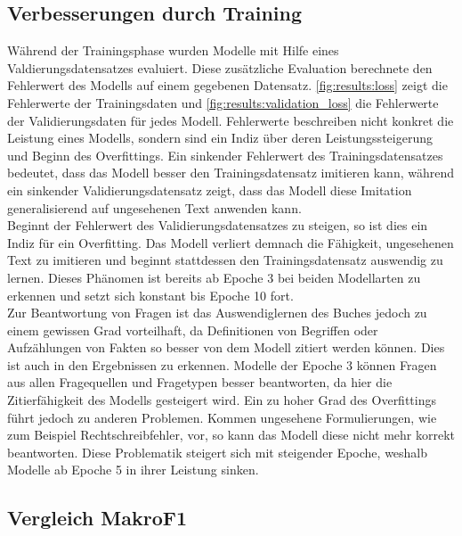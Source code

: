 \subsection{Verbesserungen durch Training}
Während der Trainingsphase wurden Modelle mit Hilfe eines Valdierungsdatensatzes evaluiert.
Diese zusätzliche Evaluation berechnete den Fehlerwert des Modells auf einem gegebenen Datensatz.
\cref{fig:results:loss} zeigt die Fehlerwerte der Trainingsdaten und \cref{fig:results:validation_loss} die Fehlerwerte der Validierungsdaten für jedes Modell.
Fehlerwerte beschreiben nicht konkret die Leistung eines Modells, sondern sind ein Indiz über deren Leistungssteigerung und Beginn des Overfittings.
Ein sinkender Fehlerwert des Trainingsdatensatzes bedeutet, dass das Modell besser den Trainingsdatensatz imitieren kann, während ein sinkender Validierungsdatensatz zeigt, dass das Modell diese Imitation generalisierend auf ungesehenen Text anwenden kann.\\

Beginnt der Fehlerwert des Validierungsdatensatzes zu steigen, so ist dies ein Indiz für ein Overfitting.
Das Modell verliert demnach die Fähigkeit, ungesehenen Text zu imitieren und beginnt stattdessen den Trainingsdatensatz auswendig zu lernen.
Dieses Phänomen ist bereits ab Epoche 3 bei beiden Modellarten zu erkennen und setzt sich konstant bis Epoche 10 fort.\\

Zur Beantwortung von Fragen ist das Auswendiglernen des Buches jedoch zu einem gewissen Grad vorteilhaft, da Definitionen von Begriffen oder Aufzählungen von Fakten so besser von dem Modell zitiert werden können.
Dies ist auch in den Ergebnissen zu erkennen.
Modelle der Epoche 3 können Fragen aus allen Fragequellen und Fragetypen besser beantworten, da hier die Zitierfähigkeit des Modells gesteigert wird.
Ein zu hoher Grad des Overfittings führt jedoch zu anderen Problemen.
Kommen ungesehene Formulierungen, wie zum Beispiel Rechtschreibfehler, vor, so kann das Modell diese nicht mehr korrekt beantworten.
Diese Problematik steigert sich mit steigender Epoche, weshalb Modelle ab Epoche 5 in ihrer Leistung sinken.\\

\subsection{Vergleich MakroF1}

